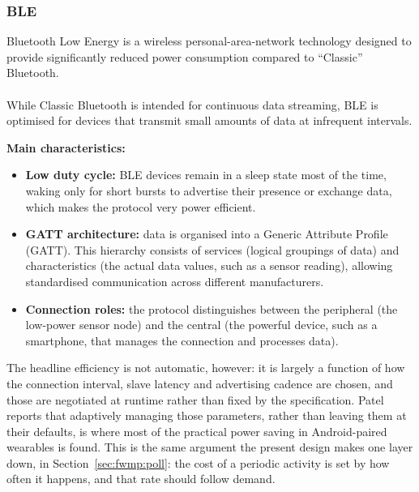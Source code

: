 \documentclass[12pt, a4paper]{article}
\begin{document}
\subsubsection{BLE}
Bluetooth Low Energy is a wireless personal-area-network technology designed to
provide significantly reduced power consumption compared to ``Classic''
Bluetooth.\\\\
While Classic Bluetooth is intended for continuous data streaming,
BLE is optimised for devices that transmit small amounts of data at infrequent
intervals.\newpage

\textbf{Main characteristics:}
\begin{itemize}
    \item \textbf{Low duty cycle:} BLE devices remain in a sleep state most of the time, waking only for short bursts to advertise their presence or exchange data, which makes the protocol very power efficient.
    \item \textbf{GATT architecture:} data is organised into a Generic Attribute Profile (GATT). This hierarchy consists of services (logical groupings of data) and characteristics (the actual data values, such as a sensor reading), allowing standardised communication across different manufacturers.
    \item \textbf{Connection roles:} the protocol distinguishes between the peripheral (the low-power sensor node) and the central (the powerful device, such as a smartphone, that manages the connection and processes data).
\end{itemize}

The headline efficiency is not automatic, however: it is largely a function of
how the connection interval, slave latency and advertising cadence are chosen,
and those are negotiated at runtime rather than fixed by the specification.
Patel~\cite{patel2025} reports that adaptively managing those parameters, rather
than leaving them at their defaults, is where most of the practical power saving
in Android-paired wearables is found. This is the same argument the present design
makes one layer down, in Section~\ref{sec:fwmp:poll}: the cost of a periodic
activity is set by how often it happens, and that rate should follow demand.
\end{document}
